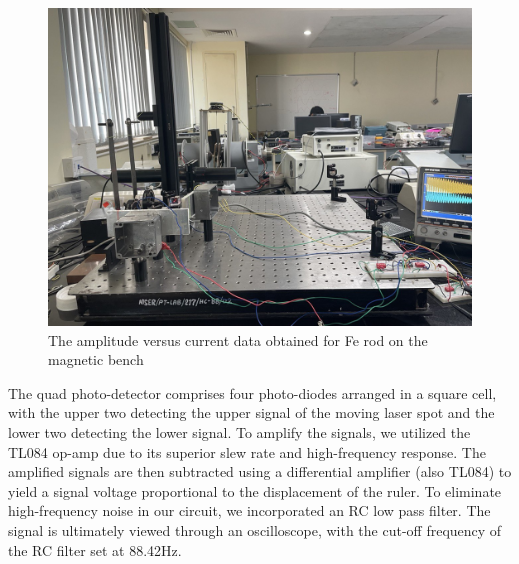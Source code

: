 \begin{figure}[H]
	\centering
	\includegraphics[scale=0.3]{setup.jpeg}
	\caption{The amplitude versus current data obtained for Fe rod on the magnetic bench}
	\label{fig:mb-fe-0}
\end{figure}
The quad photo-detector comprises four photo-diodes arranged in a square cell, with the upper two detecting the upper signal of the moving laser spot and the lower two detecting the lower signal. To amplify the signals, we utilized the TL084 op-amp due to its superior slew rate and high-frequency response. The amplified signals are then subtracted using a differential amplifier (also TL084) to yield a signal voltage proportional to the displacement of the ruler. To eliminate high-frequency noise in our circuit, we incorporated an RC low pass filter. The signal is ultimately viewed through an oscilloscope, with the cut-off frequency of the RC filter set at 88.42Hz.
